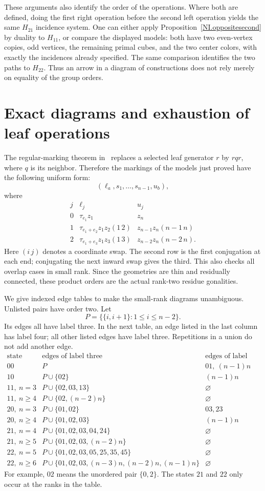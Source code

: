 These arguments also identify the order of the operations. Where
both are defined, doing the first right operation before the second
left operation yields the same $H_{21}$ incidence system. One can
either apply Proposition~\ref{NI.oppositesecond} by duality to $H_{11}$,
or compare the displayed models: both have two even-vertex copies,
odd vertices, the remaining primal cubes, and the two center colors,
with exactly the incidences already specified. The same comparison
identifies the two paths to $H_{22}$. Thus an arrow in a diagram of
constructions does not rely merely on equality of the group orders.

\section{Exact diagrams and exhaustion of leaf operations}
The regular-marking theorem in~\cite{Coset} replaces a selected leaf
generator $r$ by $rqr$, where $q$ is its neighbor. Therefore the
markings of the models just proved have the following uniform form:
\[
 (\ell_a,s_1,\ldots,s_{n-1},u_b),
\]
where
\[
\begin{array}{c|c|c}
j&\ell_j&u_j\\\hline
0&\tau_{e_1}z_1&z_n\\
1&\tau_{e_1+e_2}z_1z_2(1\,2)&z_{n-1}z_n(n-1\,n)\\
2&\tau_{e_1+e_3}z_1z_3(1\,3)&z_{n-2}z_n(n-2\,n).
\end{array}
\]
Here $(i\,j)$ denotes a coordinate swap. The second row is the
first conjugation at each end; conjugating the next inward swap
gives the third. This also checks all overlap cases in small rank.
Since the geometries are thin and residually connected, these
product orders are the actual rank-two residue gonalities.

We give indexed edge tables to make the small-rank diagrams
unambiguous. Unlisted pairs have order two. Let
\[
 P=\{\{i,i+1\}:1\le i\le n-2\}.
\]
Its edges all have label three. In the next table, an edge listed
in the last column has label four; all other listed edges have
label three. Repetitions in a union do not add another edge.
\[
\begin{array}{c|l|l}
\text{state}&\text{edges of label three}&\text{edges of label four}\\\hline
00&P&01,\ (n-1)n\\
10&P\cup\{02\}&(n-1)n\\
11,\ n=3&P\cup\{02,03,13\}&\varnothing\\
11,\ n\ge4&P\cup\{02,(n-2)n\}&\varnothing\\
20,\ n=3&P\cup\{01,02\}&03,23\\
20,\ n\ge4&P\cup\{01,02,03\}&(n-1)n\\
21,\ n=4&P\cup\{01,02,03,04,24\}&\varnothing\\
21,\ n\ge5&P\cup\{01,02,03,(n-2)n\}&\varnothing\\
22,\ n=5&P\cup\{01,02,03,05,25,35,45\}&\varnothing\\
22,\ n\ge6&P\cup\{01,02,03,(n-3)n,(n-2)n,(n-1)n\}
 &\varnothing
\end{array}
\]
For example, $02$ means the unordered pair $\{0,2\}$.
The states $21$ and $22$ only occur at the ranks in the table.

